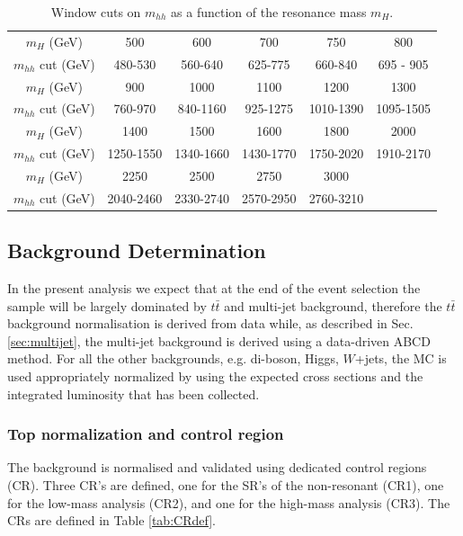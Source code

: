 \begin{table}
\begin{center}
\begin{tabular}{c|c|c|c|c|c}
$m_{H}$ (GeV)      &   500   &   600   &   700   &   750   &   800 \\
$m_{hh}$ cut (GeV) & 480-530 & 560-640 & 625-775 & 660-840 & 695 - 905 \\ 
\hline 
$m_{H}$ (GeV)      &  900   &   1000  	   &  1100   	&  1200   		&   1300    \\
$m_{hh}$ cut (GeV) & 760-970	& 840-1160 & 925-1275	&1010-1390	&1095-1505  \\
\hline 
$m_{H}$ (GeV)      &   1400  		&  1500   		&  1600   		& 1800  		& 2000\\
$m_{hh}$ cut (GeV) &1250-1550	&1340-1660	&1430-1770	& 1750-2020 	& 1910-2170\\
\hline

\hline 
$m_{H}$ (GeV)      &   2250  		&  2500   		&  2750   		& 3000  		& \\
$m_{hh}$ cut (GeV) &2040-2460	&2330-2740	&2570-2950	& 2760-3210 	& \\
\end{tabular}
\caption{Window cuts on $m_{hh}$ as a function of the resonance mass
  $m_{H}$.}
\label{tab:mhh_sig_cuts}
\end{center}
\end{table}


\subsection{Background Determination}
In the present analysis we expect that at the end of the event selection the
sample will be largely dominated by $t \bar{t}$ and multi-jet background, therefore the $t\bar{t}$ background normalisation
is derived from data while, as described in Sec. \ref{sec:multijet}, the multi-jet
background is derived using a data-driven ABCD method.
For all the other backgrounds, e.g. di-boson, Higgs, $W$+jets, the
MC is used appropriately normalized by using the expected cross sections and the
integrated luminosity that has been collected.

\subsubsection{Top normalization and control region}
\label{subsec:topCR}
The \ttbar background is normalised and validated using  dedicated
control regions (CR). Three CR's are defined, one for the SR's of the non-resonant (CR1), one for the low-mass analysis (CR2), and one for the high-mass analysis (CR3).  The CRs are defined in Table \ref{tab:CRdef}.


